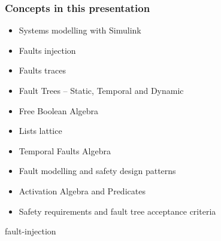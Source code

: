 \documentclass{beamer}
\begin{document}
\begin{frame}
\frametitle{Concepts in this presentation}

\begin{itemize}
  \item \alert<2>{Systems modelling with Simulink}
  \item \alert<2>{Faults injection}
  \item \alert<2>{Faults traces}
  \item Fault Trees -- \alert<2>{Static}, Temporal and Dynamic
  \item Free Boolean Algebra
  \item Lists lattice
  \item Temporal Faults Algebra
  \item Fault modelling and safety design patterns
  \item Activation Algebra and Predicates
  \item Safety requirements and fault tree acceptance criteria
\end{itemize}

\end{frame}

 {fault-injection}




\end{document}
